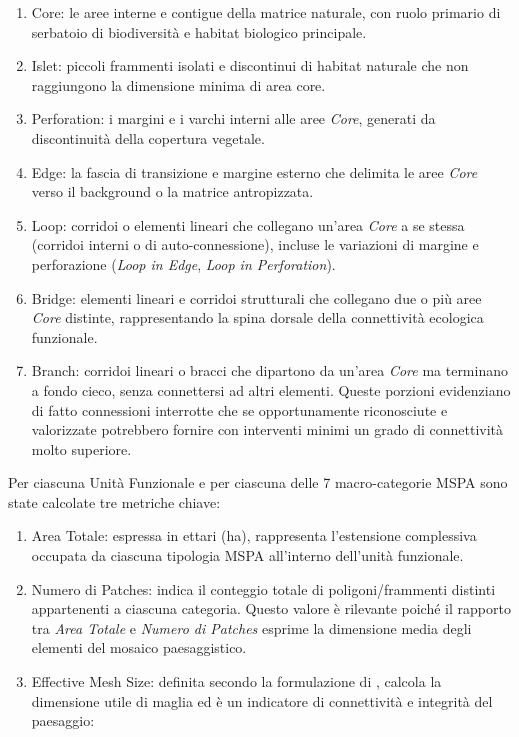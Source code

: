 \documentclass[
  a4paper,
]{book}
\providecommand{\tightlist}{%
  \setlength{\itemsep}{0pt}\setlength{\parskip}{0pt}}
\begin{document}
\begin{enumerate}
\def\labelenumi{\arabic{enumi}.}
\tightlist
\item
  Core: le aree interne e contigue della matrice naturale, con ruolo primario di serbatoio di biodiversità e habitat biologico principale.
\item
  Islet: piccoli frammenti isolati e discontinui di habitat naturale che non raggiungono la dimensione minima di area core.
\item
  Perforation: i margini e i varchi interni alle aree \emph{Core}, generati da discontinuità della copertura vegetale.
\item
  Edge: la fascia di transizione e margine esterno che delimita le aree \emph{Core} verso il background o la matrice antropizzata.
\item
  Loop: corridoi o elementi lineari che collegano un'area \emph{Core} a se stessa (corridoi interni o di auto-connessione), incluse le variazioni di margine e perforazione (\emph{Loop in Edge}, \emph{Loop in Perforation}).
\item
  Bridge: elementi lineari e corridoi strutturali che collegano due o più aree \emph{Core} distinte, rappresentando la spina dorsale della connettività ecologica funzionale.
\item
  Branch: corridoi lineari o bracci che dipartono da un'area \emph{Core} ma terminano a fondo cieco, senza connettersi ad altri elementi. Queste porzioni evidenziano di fatto connessioni interrotte che se opportunamente riconosciute e valorizzate potrebbero fornire con interventi minimi un grado di connettività molto superiore.
\end{enumerate}

Per ciascuna Unità Funzionale e per ciascuna delle 7 macro-categorie MSPA sono state calcolate tre metriche chiave:

\begin{enumerate}
\def\labelenumi{\arabic{enumi}.}
\tightlist
\item
  Area Totale: espressa in ettari (ha), rappresenta l'estensione complessiva occupata da ciascuna tipologia MSPA all'interno dell'unità funzionale.
\item
  Numero di Patches: indica il conteggio totale di poligoni/frammenti distinti appartenenti a ciascuna categoria. Questo valore è rilevante poiché il rapporto tra \emph{Area Totale} e \emph{Numero di Patches} esprime la dimensione media degli elementi del mosaico paesaggistico.
\item
  Effective Mesh Size: definita secondo la formulazione di \citep{jaeger2000}, calcola la dimensione utile di maglia ed è un indicatore di connettività e integrità del paesaggio:
\end{enumerate}
\end{document}
